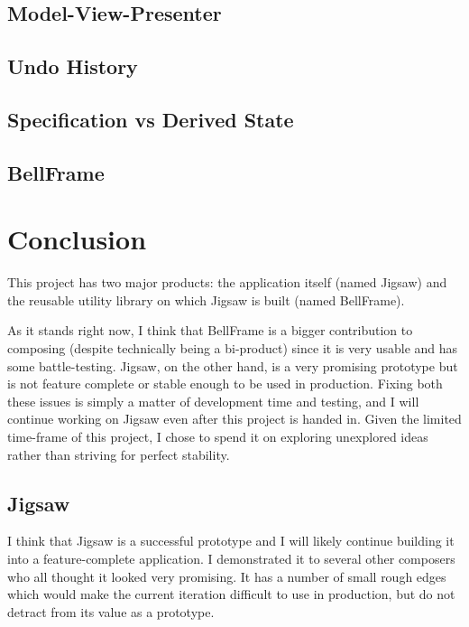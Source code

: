 \documentclass[12pt]{article}
\begin{document}
\subsection{Model-View-Presenter}

\subsection{Undo History}

\subsection{Specification vs Derived State}

\subsection{BellFrame}



\pagebreak

\section{Conclusion}

This project has two major products: the application itself (named Jigsaw) and the reusable utility
library on which Jigsaw is built (named BellFrame).

As it stands right now, I think that BellFrame is a bigger contribution to composing (despite
technically being a bi-product) since it is very usable and has some battle-testing.  Jigsaw, on
the other hand, is a very promising prototype but is not feature complete or stable enough to be
used in production.  Fixing both these issues is simply a matter of development time and testing, 
and I will continue working on Jigsaw even after this project is handed in.  Given the limited
time-frame of this project, I chose to spend it on exploring unexplored ideas rather than striving
for perfect stability.

\subsection{Jigsaw}

I think that Jigsaw is a successful prototype and I will likely continue building it into a
feature-complete application.  I demonstrated it to several other composers who all thought it
looked very promising.  It has a number of small rough edges which would make the current iteration
difficult to use in production, but do not detract from its value as a prototype.
\end{document}
